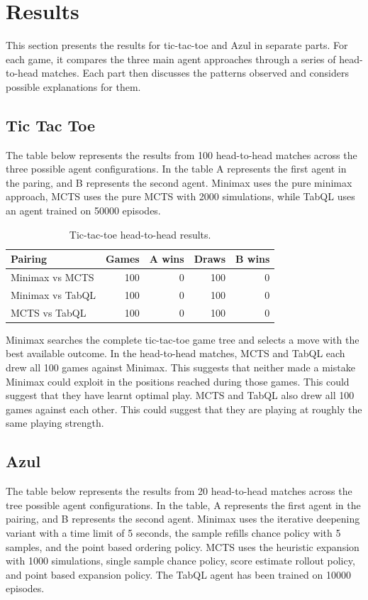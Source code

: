 \section{Results}
This section presents the results for tic-tac-toe and Azul in separate parts. For each game, it compares the three main agent approaches through a series of head-to-head matches. Each part then discusses the patterns observed and considers possible explanations for them.

\subsection{Tic Tac Toe}
The table below represents the results from 100 head-to-head matches across the three possible agent configurations. In the table A represents the first agent in the paring, and B represents the second agent. Minimax uses the pure minimax approach, MCTS uses the pure MCTS with 2000 simulations, while TabQL uses an agent trained on 50000 episodes.

\begin{table}[htbp]
    \centering
    \begin{tabular}{lrrrr}
        \hline
        Pairing & Games & A wins & Draws & B wins \\
        \hline
        Minimax vs MCTS  & 100 & 0 & 100 & 0 \\
        Minimax vs TabQL & 100 & 0 & 100 & 0 \\
        MCTS vs TabQL    & 100 & 0 & 100 & 0 \\
        \hline
    \end{tabular}
    \caption{Tic-tac-toe head-to-head results.}
    \label{tab:tictactoe-results}
\end{table}

Minimax searches the complete tic-tac-toe game tree and selects a move with the best available outcome. In the head-to-head matches, MCTS and TabQL each drew all 100 games against Minimax. This suggests that neither made a mistake Minimax could exploit in the positions reached during those games. This could suggest that they have learnt optimal play. MCTS and TabQL also drew all 100 games against each other. This could suggest that they are playing at roughly the same playing strength.

\subsection{Azul}
The table below represents the results from 20 head-to-head matches across the tree possible agent configurations. In the table, A represents the first agent in the pairing, and B represents the second agent. Minimax uses the iterative deepening variant with a time limit of 5 seconds, the sample refills chance policy with 5 samples, and the point based ordering policy. MCTS uses the heuristic expansion with 1000 simulations, single sample chance policy, score estimate rollout policy, and point based expansion policy. The TabQL agent has been trained on 10000 episodes. 


